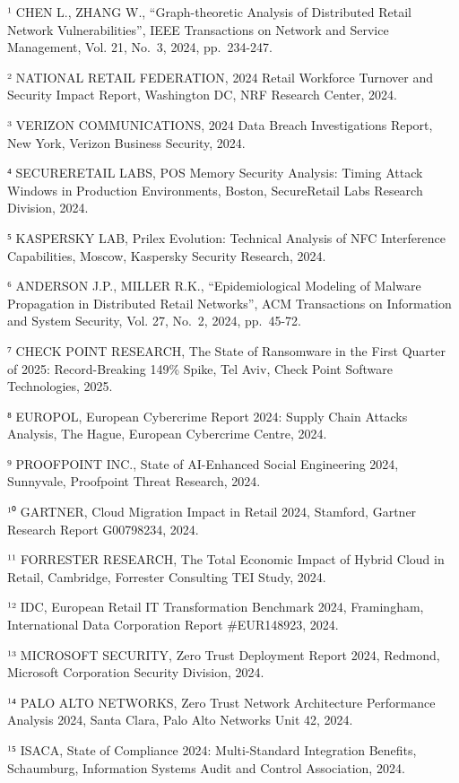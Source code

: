 \documentclass{report}
\begin{document}
¹ CHEN L., ZHANG W., ``Graph-theoretic Analysis of Distributed Retail
Network Vulnerabilities'', IEEE Transactions on Network and Service
Management, Vol. 21, No.~3, 2024, pp.~234-247.

² NATIONAL RETAIL FEDERATION, 2024 Retail Workforce Turnover and
Security Impact Report, Washington DC, NRF Research Center, 2024.

³ VERIZON COMMUNICATIONS, 2024 Data Breach Investigations Report, New
York, Verizon Business Security, 2024.

⁴ SECURERETAIL LABS, POS Memory Security Analysis: Timing Attack Windows
in Production Environments, Boston, SecureRetail Labs Research Division,
2024.

⁵ KASPERSKY LAB, Prilex Evolution: Technical Analysis of NFC
Interference Capabilities, Moscow, Kaspersky Security Research, 2024.

⁶ ANDERSON J.P., MILLER R.K., ``Epidemiological Modeling of Malware
Propagation in Distributed Retail Networks'', ACM Transactions on
Information and System Security, Vol. 27, No.~2, 2024, pp.~45-72.

⁷ CHECK POINT RESEARCH, The State of Ransomware in the First Quarter of
2025: Record-Breaking 149\% Spike, Tel Aviv, Check Point Software
Technologies, 2025.

⁸ EUROPOL, European Cybercrime Report 2024: Supply Chain Attacks
Analysis, The Hague, European Cybercrime Centre, 2024.

⁹ PROOFPOINT INC., State of AI-Enhanced Social Engineering 2024,
Sunnyvale, Proofpoint Threat Research, 2024.

¹⁰ GARTNER, Cloud Migration Impact in Retail 2024, Stamford, Gartner
Research Report G00798234, 2024.

¹¹ FORRESTER RESEARCH, The Total Economic Impact of Hybrid Cloud in
Retail, Cambridge, Forrester Consulting TEI Study, 2024.

¹² IDC, European Retail IT Transformation Benchmark 2024, Framingham,
International Data Corporation Report \#EUR148923, 2024.

¹³ MICROSOFT SECURITY, Zero Trust Deployment Report 2024, Redmond,
Microsoft Corporation Security Division, 2024.

¹⁴ PALO ALTO NETWORKS, Zero Trust Network Architecture Performance
Analysis 2024, Santa Clara, Palo Alto Networks Unit 42, 2024.

¹⁵ ISACA, State of Compliance 2024: Multi-Standard Integration Benefits,
Schaumburg, Information Systems Audit and Control Association, 2024.
\end{document}
